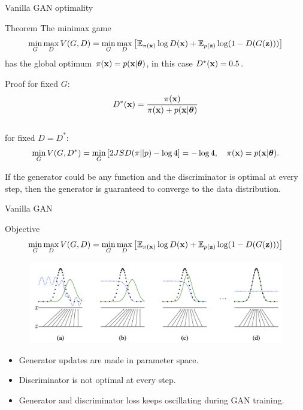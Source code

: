 \begin{frame}{Vanilla GAN optimality}
	\begin{block}{Theorem}
		The minimax game 
		\vspace{-0.1cm}
		\[
			\min_{G} \max_D  V(G, D) = \min_{G} \max_D \left[ \mathbb{E}_{\pi(\mathbf{x})} \log D(\mathbf{x}) + \mathbb{E}_{p(\mathbf{z})} \log (1 - D(G(\mathbf{z}))) \right]
		\]
		has the global optimum $\pi(\mathbf{x}) = p(\mathbf{x} | \boldsymbol{\theta})$, in this case $D^*(\mathbf{x}) = 0.5$.
	\end{block}
	\vspace{-0.2cm}
	\begin{block}{Proof}
	for fixed $G$:
	\[
		D^*(\mathbf{x}) = \frac{\pi(\mathbf{x})}{\pi(\mathbf{x}) + p(\mathbf{x} | \boldsymbol{\theta})}
	\]
	\vspace{-0.5cm} \\
	for fixed $D = D^*$:
	\[
		\min_{G} V(G, D^*) = \min_{G} \left[ 2 JSD(\pi || p) - \log 4 \right] = -\log 4, \quad \pi(\mathbf{x}) = p(\mathbf{x} | \boldsymbol{\theta}).
	\]
	\vspace{-0.6cm}
	\end{block}
	If the generator could be any function and the discriminator is optimal at every step, then the generator is guaranteed to converge to the data distribution.
\end{frame}
\begin{frame}{Vanilla GAN}
	\begin{block}{Objective}
		\vspace{-0.4cm}
		\[
		\min_{G} \max_D V(G, D) = \min_{G} \max_D \left[ \mathbb{E}_{\pi(\mathbf{x})} \log D(\mathbf{x}) + \mathbb{E}_{p(\mathbf{z})} \log (1 - D(G(\mathbf{z}))) \right]
		\]
		\vspace{-0.4cm}
	\end{block}

	\begin{figure}
		\centering
		\includegraphics[width=1.0\linewidth]{figs/gan_1}
	\end{figure}
	\begin{itemize}
		\item Generator updates are made in parameter space.
		\item Discriminator is not optimal at every step.
		\item Generator and discriminator loss keeps oscillating during GAN training.
	\end{itemize}

\end{frame}
